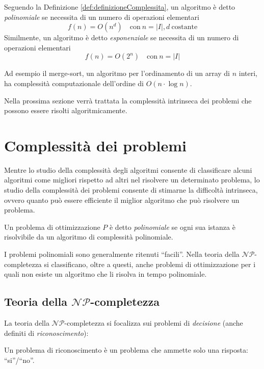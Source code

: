 Seguendo la Definizione \ref{def:definizioneComplessita}, un algoritmo è detto 
\emph{polinomiale} se necessita di un numero di operazioni elementari
\begin{displaymath}
 f(n) = O(n^d) \quad \text{con}\  n = \vert I \vert, d\  \text{costante}
\end{displaymath}
Similmente, un algoritmo è detto \emph{esponenziale} se necessita di un numero di 
operazioni elementari
\begin{displaymath}
 f(n) = O(2^n) \quad \text{con}\ n = \vert I \vert
\end{displaymath}

Ad esempio il merge-sort, un algoritmo per l'ordinamento di un array di $n$ interi, ha 
complessità computazionale dell'ordine di $O(n\cdot \log n)$.

Nella prossima sezione verrà trattata la complessità intrinseca dei problemi che possono 
essere risolti algoritmicamente.

\section{Complessità dei problemi}
\label{sec:complessitaProblemi}
Mentre lo studio della complessità degli algoritmi consente di classificare alcuni 
algoritmi come migliori rispetto ad altri nel risolvere un determinato problema, lo 
studio della complessità dei problemi consente di stimarne la difficoltà intrinseca, 
ovvero quanto può essere efficiente il miglior algoritmo che può risolvere un problema.

\begin{mydef}
 Un problema di ottimizzazione $P$ è detto \emph{polinomiale} se ogni sua istanza è 
risolvibile da un algoritmo di complessità polinomiale.
\end{mydef}
I problemi polinomiali sono generalmente ritenuti ``facili''. Nella teoria della 
$\mathcal{NP}$-completezza si classificano, oltre a questi, anche problemi di 
ottimizzazione per i quali non esiste un algoritmo che li risolva in tempo polinomiale.


\subsection{Teoria della $\mathcal{NP}$-completezza}
La teoria della $\mathcal{NP}$-completezza si focalizza sui problemi di \emph{decisione}
(anche definiti di \emph{riconoscimento}):
\begin{mydef}
 Un problema di riconoscimento è un problema che ammette solo una risposta: ``si''/``no''.
\end{mydef}

